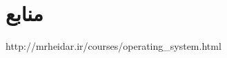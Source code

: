 \documentclass{article}
\begin{document}
\section*{منابع}
\renewcommand{\section}[2]{}%
\begin{thebibliography}{99} %


\begin{LTRitems}

\resetlatinfont

 http://mrheidar.ir/courses/operating\_system.html
\end{LTRitems}

\end{thebibliography}
\end{document}
